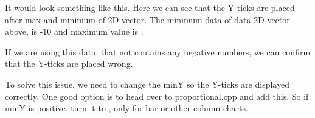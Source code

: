 It would look something like this. Here we can see that the Y-\/ticks are placed after max and minimum of {\ttfamily 2D} vector. The minimum data of {\ttfamily data} 2D vector above, is {\ttfamily -\/10} and maximum value is {}.



If we are using this data, that not contains any negative numbers, we can confirm that the Y-\/ticks are placed wrong.


\begin{DoxyCode}{0}
\DoxyCodeLine{\textcolor{comment}{//\ Create\ data\ for\ bar}}
\DoxyCodeLine{}

\end{DoxyCode}




To solve this issue, we need to change the {\ttfamily minY} so the {\ttfamily Y}-\/ticks are displayed correctly. One good option is to head over to {\ttfamily proportional.\+cpp} and add this. So if {\ttfamily minY} is positive, turn it to {}, only for {\ttfamily bar} or other column charts.


